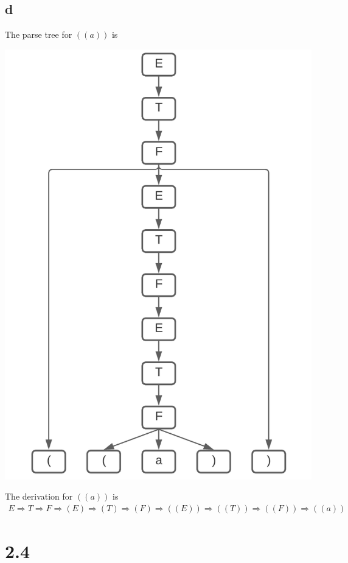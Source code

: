 \documentclass{article}
\begin{document}
\subsection*{d}
The parse tree for $((a))$ is
\begin{center}
    \includegraphics[scale=.65]{2.1.d.png}
\end{center}
The derivation for $((a))$ is
\begin{align*}
    E \Rightarrow T \Rightarrow F \Rightarrow(E) \Rightarrow (T) \Rightarrow (F) \Rightarrow ((E)) \Rightarrow ((T)) \Rightarrow ((F)) \Rightarrow((a))
\end{align*}

\pagebreak

\section*{2.4}
\end{document}
